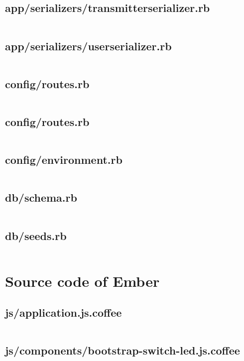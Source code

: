 \documentclass[letterpaper, 12 pt]{article}
\begin{document}
\subsection{app/serializers/transmitter\textunderscore serializer.rb}
\inputminted{ruby}{../app/serializers/transmitter_serializer.rb}
\subsection{app/serializers/user\textunderscore serializer.rb}
\inputminted{ruby}{../app/serializers/user_serializer.rb}

\subsection{config/routes.rb}
\inputminted{ruby}{../config/routes.rb}
\subsection{config/routes.rb}
\inputminted{ruby}{../config/routes.rb}
\subsection{config/environment.rb}
\inputminted{ruby}{../config/environment.rb}

\subsection{db/schema.rb}
\inputminted{ruby}{../db/schema.rb}
\subsection{db/seeds.rb}
\inputminted{ruby}{../db/seeds.rb}

\section{Source code of Ember}
\subsection{js/application.js.coffee}
\inputminted{ruby}{../app/assets/javascripts/application.js.coffee}

\subsection{js/components/bootstrap-switch-led.js.coffee}
\inputminted{ruby}{../app/assets/javascripts/components/bootstrap-switch-led.js.coffee}
\end{document}
